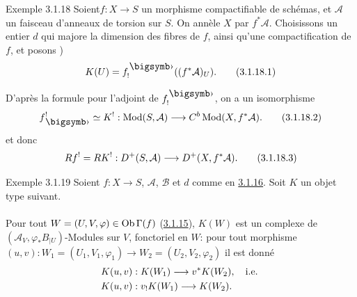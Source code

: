 \documentclass[10pt]{../fichiers-configuration-latex/smfart}
\begin{document}
\begin{enonce*}[remark]{Exemple 3.1.18}
Soient\pageoriginale $f:X\rightarrow S$ un morphisme compactifiable de
schémas, et $\mathcal{A}$ un faisceau d'anneaux de torsion sur $S$. On
annèle $X$ par $f^{\ast}\mathcal{A}$. Choisissons un entier $d$ qui
majore la dimension des fibres de $f$, ainsi qu'une compactification
de $f$, et posons )
\begin{equation*}
K(U)=f^{\bigdot}_{!}((f^{\ast}\mathcal{A})_{U}){\quoi}.\tag{3.1.18.1}
\end{equation*}
\end{enonce*}

D'après la formule  pour l'adjoint de $f^{\bigdot}_{!}$, on a
un isomorphisme
\begin{equation*}
f^{!}_{\bigdot}\simeq K^{!}:\Mod(S,\mathcal{A})\longrightarrow C^{b}\Mod(X,f^{\ast}\mathcal{A}){\quoi}.\tag{3.1.18.2}
\end{equation*}%
et donc
\begin{equation*}
Rf^{!}=RK^{!}:D^{+}(S,\mathcal{A})\longrightarrow
D^{+}(X,f^{\ast}\mathcal{A}){}.\tag{3.1.18.3}
\end{equation*}

\begin{enonce*}[remark]{Exemple 3.1.19}
Soient $f:X\rightarrow S$, $\mathcal{A}$, $\mathcal{B}$ et $d$ comme
en \hyperref[XVIII.subsubsec3.1.16]{3.1.16}. Soit $K$ un objet 
type suivant.
\end{enonce*}

\setcounter{subsubsection}{19}
\setcounter{paragraph}{0}
\paragraph{}
Pour tout $W=(U,V,\varphi)\in \operatorname{Ob} \Gamma(f)$
(\hyperref[XVIII.subsubsec3.1.15]{3.1.15}), $K(W)$ est un 
complexe de $(\mathcal{A}_{V},\varphi_{\ast}B_{|U})$-Modules sur $V$,
fonctoriel en $W$: pour tout morphisme $(u,v):
W_{1}=(U_{1},V_{1},\varphi_{1})\to W_{2}=(U_{2},V_{2},\varphi_{2})$ il
est donné
\begin{align*}
K(u,v) &: K(W_{1})\longrightarrow v^{\ast}K(W_{2}),\quad\mbox{{i.e.}\kern.3em}\\
K(u,v) &: v_{!}K(W_{1})\longrightarrow K(W_{2}){}.
\end{align*}
\end{document}
